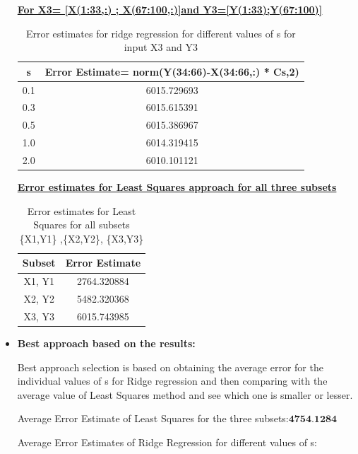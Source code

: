 \documentclass[11pt]{article}
\begin{document}
\begin{itemize}
		\textbf{\underline{For X3= [X(1:33,:) ; X(67:100,:)]and Y3=[Y(1:33);Y(67:100)]}}
		\begin{table}[h]
			\centering
			\begin{tabular}{|c|c|}
				\hline
				\textbf{s}  & \textbf{Error Estimate= norm(Y(34:66)-X(34:66,:) * Cs,2)}\\
				\hline
				0.1 &  6015.729693  \\
				\hline
				0.3&  6015.615391 \\
				\hline
				0.5 &  6015.386967 \\
				\hline
				1.0 & 6014.319415  \\
				\hline
				2.0 & 6010.101121 \\
				\hline
			\end{tabular}
			\caption{Error estimates for ridge regression for different values of s for input X3 and Y3 }
			\label{t2}
		\end{table}
		
		
		\textbf{\underline{Error estimates for Least Squares approach for all three subsets}}
		\begin{table}[h]
			\centering
			\begin{tabular}{|c|c|}
				\hline
				\textbf{Subset}  & \textbf{Error Estimate}\\
				\hline
				X1, Y1 &  2764.320884  \\
				\hline
				X2, Y2&  5482.320368 \\
				\hline
				X3, Y3 &  6015.743985 \\
				\hline
				\end{tabular}
			\caption{Error estimates for Least Squares for all subsets \{X1,Y1\} ,\{X2,Y2\}, \{X3,Y3\} }
			\label{t2}
		\end{table}
		
	\item[] \textbf{ Best approach based on the results:}
	
	Best approach selection is based on obtaining the average error for the individual values of s for Ridge regression and then comparing with the average value of Least Squares method and see which one is smaller or lesser.
	
	Average Error Estimate of Least Squares for the three subsets:$\boxed{\textbf{4754.1284}}$
	
	Average Error Estimates of Ridge Regression for different values of s:\\


\end{itemize}
\end{document}

